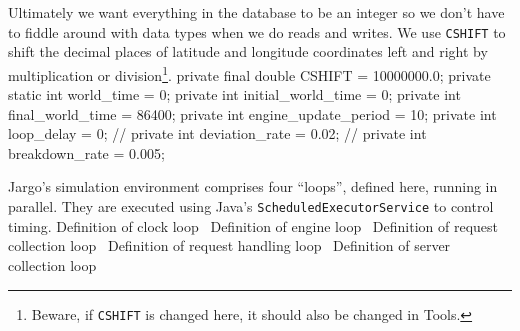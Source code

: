 \documentclass{article}
\newcommand{\hi}[1]{\noindent {\bf #1}}     %
\def\nwendcode{\endtrivlist \endgroup}      %
\let\nwdocspar=\par
\begin{document}
Ultimately we want everything in the database to be an integer so we don't have
to fiddle around with data types when we do reads and writes. We use {\tt{}\protect{}CSHIFT}
to shift the decimal places of latitude and longitude coordinates left and
right by multiplication or division\footnote{Beware, if {\tt{}\protect{}CSHIFT} is changed
here, it should also be changed in Tools.}.
\nwenddocs{}\endmoddef{}
private final double CSHIFT = 10000000.0;
private static int world_time = 0;
private int initial_world_time = 0;
private int final_world_time = 86400;
private int engine_update_period = 10;
private int loop_delay = 0;
// private int deviation_rate = 0.02;
// private int breakdown_rate = 0.005;
\eatline
{}\nwendcode{}\nwdocspar
\hi{Loops.} Jargo's simulation environment comprises four ``loops'', defined
here, running in parallel. They are executed using Java's
{\tt{}ScheduledExecutorService} to control timing.
\nwenddocs{}\endmoddef{}
\LA{}Definition of clock loop~{\nwtagstyle{}}\RA{}
\LA{}Definition of engine loop~{\nwtagstyle{}}\RA{}
\LA{}Definition of request collection loop~{\nwtagstyle{}}\RA{}
\LA{}Definition of request handling loop~{\nwtagstyle{}}\RA{}
\LA{}Definition of server collection loop~{\nwtagstyle{}}\RA{}
\nwendcode{}\nwdocspar
\end{document}
